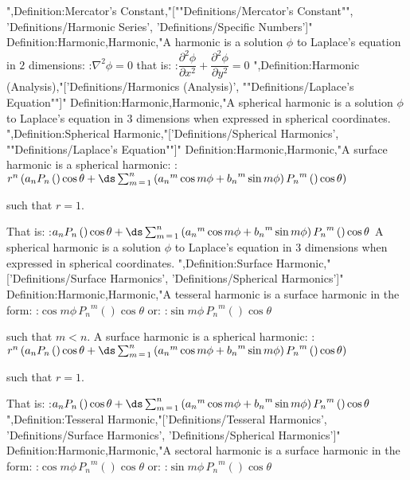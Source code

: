 ",Definition:Mercator's Constant,"[""Definitions/Mercator's Constant"", 'Definitions/Harmonic Series', 'Definitions/Specific Numbers']"
Definition:Harmonic,Harmonic,"A harmonic is a solution $\phi$ to Laplace's equation in $2$ dimensions:
:$\nabla^2 \phi = 0$
that is:
:$\dfrac {\partial^2 \phi} {\partial x^2} + \dfrac {\partial^2 \phi} {\partial y^2} = 0$
",Definition:Harmonic (Analysis),"['Definitions/Harmonics (Analysis)', ""Definitions/Laplace's Equation""]"
Definition:Harmonic,Harmonic,"A spherical harmonic is a solution $\phi$ to Laplace's equation in $3$ dimensions when expressed in spherical coordinates.
",Definition:Spherical Harmonic,"['Definitions/Spherical Harmonics', ""Definitions/Laplace's Equation""]"
Definition:Harmonic,Harmonic,"A surface harmonic is a spherical harmonic:
:$r^n \left( a_n P_n \left(   \right){\cos \theta} + \ds \sum_{m \mathop = 1}^n \left(  {a_n}^m \cos m \phi + {b_n}^m \sin m \phi \right)  {P_n}^m \left(   \right){\cos \theta}  \right)$

such that $r = 1$.

That is:
:$a_n P_n \left(   \right){\cos \theta} + \ds \sum_{m \mathop = 1}^n \left(  {a_n}^m \cos m \phi + {b_n}^m \sin m \phi \right)  {P_n}^m \left(   \right){\cos \theta}$
A spherical harmonic is a solution $\phi$ to Laplace's equation in $3$ dimensions when expressed in spherical coordinates.
",Definition:Surface Harmonic,"['Definitions/Surface Harmonics', 'Definitions/Spherical Harmonics']"
Definition:Harmonic,Harmonic,"A tesseral harmonic is a surface harmonic in the form:
:$\cos m \phi \,  {P_n}^m \left(   \right){\cos \theta}$
or:
:$\sin m \phi \,  {P_n}^m \left(   \right){\cos \theta}$

such that $m < n$.
A surface harmonic is a spherical harmonic:
:$r^n \left( a_n P_n \left(   \right){\cos \theta} + \ds \sum_{m \mathop = 1}^n \left(  {a_n}^m \cos m \phi + {b_n}^m \sin m \phi \right)  {P_n}^m \left(   \right){\cos \theta}  \right)$

such that $r = 1$.

That is:
:$a_n P_n \left(   \right){\cos \theta} + \ds \sum_{m \mathop = 1}^n \left(  {a_n}^m \cos m \phi + {b_n}^m \sin m \phi \right)  {P_n}^m \left(   \right){\cos \theta}$
",Definition:Tesseral Harmonic,"['Definitions/Tesseral Harmonics', 'Definitions/Surface Harmonics', 'Definitions/Spherical Harmonics']"
Definition:Harmonic,Harmonic,"A sectoral harmonic is a surface harmonic in the form:
:$\cos m \phi \,  {P_n}^m \left(   \right){\cos \theta}$
or:
:$\sin m \phi \,  {P_n}^m \left(   \right){\cos \theta}$

